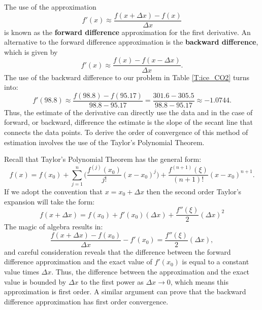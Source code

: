 \documentclass[twoside]{article}
\def\ds{\displaystyle}
\begin{document}
The use of the approximation 
\begin{equation}
    f'(x) \approx \frac {f(x+\Delta x)-f(x)}{\Delta x}
    \label{e:def_forward_difference}
\end{equation}
is known as the {\bf forward difference} approximation for the first derivative. An alternative to the forward difference approximation is the {\bf backward difference}, which is given by
\begin{equation}
    f'(x) \approx \frac {f(x)-f(x-\Delta x)}{\Delta x}.
    \label{e:def_backward_difference}
\end{equation}
The use of the backward difference to our problem in Table \ref{T:ice_CO2} turns into:
$$f'(98.8) \approx \frac {f(98.8)-f(95.17)}{98.8-95.17}=\frac{301.6-305.5}{98.8-95.17}\approx -1.0744 . $$
Thus, the estimate of the derivative can directly use the data and in the case of forward, or backward, difference the estimate is the slope of the secant line that connects the data points. To derive the order of convergence of this method of estimation involves the use of the Taylor's Polynomial Theorem. 

Recall that Taylor's Polynomial Theorem has the general form:
$$f(x) = f(x_0) + \sum_{j=1}^n\biggr( \frac {f^{(j)}(x_0)}{j!}(x-x_0)^j\biggr) + \frac {f^{(n+1)}(\xi)}{(n+1)!}(x-x_0)^{n+1} .$$
If we adopt the convention that $\ds x = x_0+\Delta x$ then the second order Taylor's expansion will take the form:
$$f(x+\Delta x) = f(x_0) + f'(x_0)(\Delta x) + \frac {f''(\xi)}2(\Delta x)^2$$
The magic of algebra results in:
$$\frac {f(x+\Delta x)-f(x_0)}{\Delta x} - f'(x_0)  = \frac {f''(\xi)}2(\Delta x),$$
and careful consideration reveals that the difference between the forward difference approximation and the exact value of $f'(x_0)$ is equal to a constant value times $\Delta x$. Thus, the difference between the approximation and the exact value is bounded by $\ds \Delta x$ to the first power as $\ds \Delta x \rightarrow 0$, which means this approximation is first order. A similar argument can prove that the backward difference approximation has first order convergence. 
\end{document}

